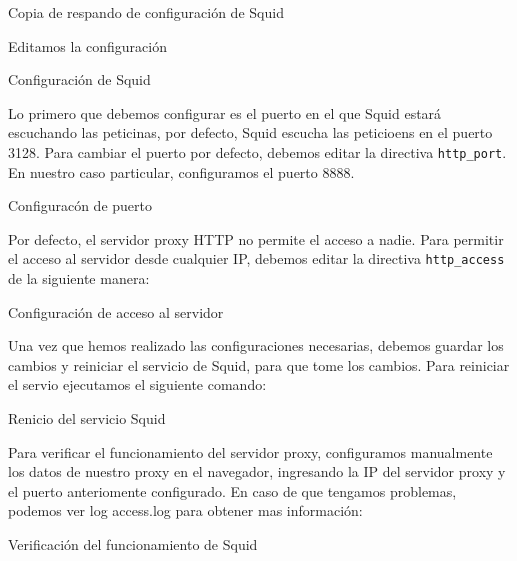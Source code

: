 \begin{listing}[H]
  \caption{Copia de respando de configuración de Squid}
  \label{soa:tecnologias:squid-cache02:bash-preparacion}
\end{listing}

Editamos la configuración

\begin{listing}[H]
  \caption{Configuración de Squid}
  \label{soa:tecnologias:squid-cache03:bash-preparacion}
\end{listing}

Lo primero que debemos configurar es el puerto en el que Squid estará escuchando las peticinas, por defecto, Squid escucha las peticioens en el puerto 3128.  Para cambiar el puerto por defecto, debemos editar la directiva \texttt{http\_port}.  En nuestro caso particular, configuramos el puerto 8888.

\begin{listing}[H]
  \caption{Configuracón de puerto}
  \label{soa:tecnologias:squid-cache04:bash-preparacion}
\end{listing}

Por defecto, el servidor proxy HTTP no permite el acceso a nadie.  Para permitir el acceso al servidor desde cualquier IP, debemos editar la directiva \texttt{http\_access} de la siguiente manera:

\begin{listing}[H]
  \caption{Configuración de acceso al servidor}
  \label{soa:tecnologias:squid-cache05:bash-preparacion}
\end{listing}

Una vez que hemos realizado las configuraciones necesarias, debemos guardar los cambios y reiniciar el servicio de Squid, para que tome los cambios.  Para reiniciar el servio ejecutamos el siguiente comando:

\begin{listing}[H]
  \caption{Renicio del servicio Squid}
  \label{soa:tecnologias:squid-cache06:bash-preparacion}
\end{listing}

Para verificar el funcionamiento del servidor proxy, configuramos manualmente los datos de nuestro proxy en el navegador, ingresando la IP del servidor proxy y el puerto anteriomente configurado.
En caso de que tengamos problemas, podemos ver log access.log para obtener mas información:

\begin{listing}[H]
  \caption{Verificación del funcionamiento de Squid}
  \label{soa:tecnologias:squid-cache07:bash-preparacion}
\end{listing}
